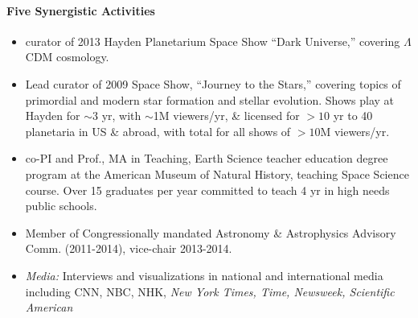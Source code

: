 \documentclass[11pt]{article}
\begin{document}
\paragraph{Five Synergistic Activities}
\begin{itemize}
\setlength{\itemsep}{-\parsep}
\setlength{\topsep}{-\parsep}
\setlength{\partopsep}{-\parsep}
\item curator of 2013 Hayden Planetarium Space Show
  ``Dark Universe,'' covering $\Lambda$CDM cosmology. 
\item Lead curator of 2009 Space Show, ``Journey to the Stars,''
  covering topics of primordial and modern star formation and stellar evolution.
 Shows play at Hayden for $\sim$3 yr,
  with $\sim$1M viewers/yr, \& licensed for $> 10$ yr to
  40 planetaria in US \& abroad, with total for all shows of $> 10$M viewers/yr.
\item co-PI and
  Prof., MA in Teaching, 
  Earth Science teacher education degree program at the American
  Museum of Natural History, teaching Space Science course. Over 15
  graduates per year committed to teach 4 yr in high needs public
  schools.
\item Member of Congressionally mandated Astronomy \& Astrophysics
  Advisory Comm. (2011-2014), vice-chair 2013-2014.
\item {\em Media:} Interviews and visualizations in national and international
media including CNN, NBC, NHK, {\em New York Times, Time, Newsweek,
Scientific American}
\end{itemize}
\end{document}
